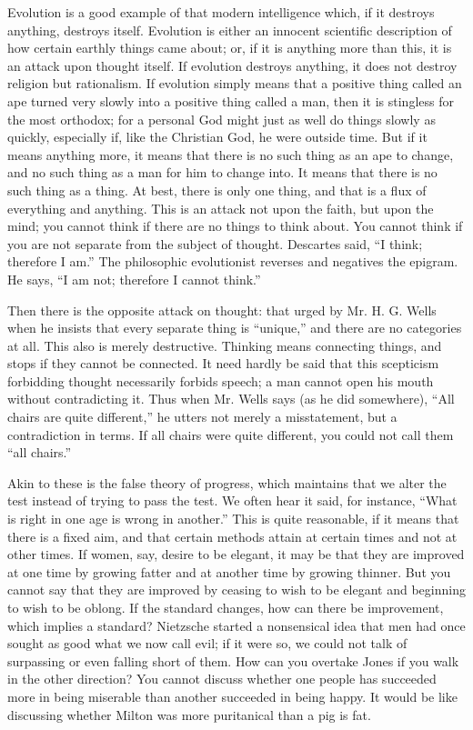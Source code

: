 Evolution is a good example of that modern intelligence which, if it destroys anything, destroys itself. Evolution is either an innocent scientific description of how certain earthly things came about; or, if it is anything more than this, it is an attack upon thought itself. If evolution destroys anything, it does not destroy religion but rationalism. If evolution simply means that a positive thing called an ape turned very slowly into a positive thing called a man, then it is stingless for the most orthodox; for a personal God might just as well do things slowly as quickly, especially if, like the Christian God, he were outside time. But if it means anything more, it means that there is no such thing as an ape to change, and no such thing as a man for him to change into. It means that there is no such thing as a thing. At best, there is only one thing, and that is a flux of everything and anything. This is an attack not upon the faith, but upon the mind; you cannot think if there are no things to think about. You cannot think if you are not separate from the subject of thought. Descartes said, “I think; therefore I am.” The philosophic evolutionist reverses and negatives the epigram. He says, “I am not; therefore I cannot think.”

Then there is the opposite attack on thought: that urged by Mr. H. G. Wells when he insists that every separate thing is “unique,” and there are no categories at all. This also is merely destructive. Thinking means connecting things, and stops if they cannot be connected. It need hardly be said that this scepticism forbidding thought necessarily forbids speech; a man cannot open his mouth without contradicting it. Thus when Mr. Wells says (as he did somewhere), “All chairs are quite different,” he utters not merely a misstatement, but a contradiction in terms. If all chairs were quite different, you could not call them “all chairs.”

Akin to these is the false theory of progress, which maintains that we alter the test instead of trying to pass the test. We often hear it said, for instance, “What is right in one age is wrong in another.” This is quite reasonable, if it means that there is a fixed aim, and that certain methods attain at certain times and not at other times. If women, say, desire to be elegant, it may be that they are improved at one time by growing fatter and at another time by growing thinner. But you cannot say that they are improved by ceasing to wish to be elegant and beginning to wish to be oblong. If the standard changes, how can there be improvement, which implies a standard? Nietzsche started a nonsensical idea that men had once sought as good what we now call evil; if it were so, we could not talk of surpassing or even falling short of them. How can you overtake Jones if you walk in the other direction? You cannot discuss whether one people has succeeded more in being miserable than another succeeded in being happy. It would be like discussing whether Milton was more puritanical than a pig is fat.

